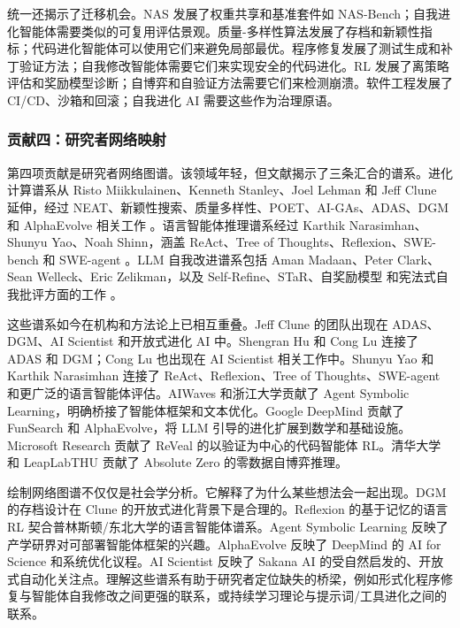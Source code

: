 统一还揭示了迁移机会。NAS 发展了权重共享和基准套件如 NAS-Bench；自我进化智能体需要类似的可复用评估景观。质量-多样性算法发展了存档和新颖性指标；代码进化智能体可以使用它们来避免局部最优。程序修复发展了测试生成和补丁验证方法；自我修改智能体需要它们来实现安全的代码进化。RL 发展了离策略评估和奖励模型诊断；自博弈和自验证方法需要它们来检测崩溃。软件工程发展了 CI/CD、沙箱和回滚；自我进化 AI 需要这些作为治理原语。

\subsubsection{贡献四：研究者网络映射}

第四项贡献是研究者网络图谱。该领域年轻，但文献揭示了三条汇合的谱系。进化计算谱系从 Risto Miikkulainen、Kenneth Stanley、Joel Lehman 和 Jeff Clune 延伸，经过 NEAT、新颖性搜索、质量多样性、POET、AI-GAs、ADAS、DGM 和 AlphaEvolve 相关工作 \cite{stanley2002evolving,lehman2011abandoning,clune2019ai,adas2025,darwingodelmachine2025}。语言智能体推理谱系经过 Karthik Narasimhan、Shunyu Yao、Noah Shinn，涵盖 ReAct、Tree of Thoughts、Reflexion、SWE-bench 和 SWE-agent \cite{yao2023react,yao2023tree,reflexion2023}。LLM 自我改进谱系包括 Aman Madaan、Peter Clark、Sean Welleck、Eric Zelikman，以及 Self-Refine、STaR、自奖励模型 \cite{selfrewarding2024} 和宪法式自我批评方面的工作 \cite{selfrefine2023,star2022,constitutionalai2022}。

这些谱系如今在机构和方法论上已相互重叠。Jeff Clune 的团队出现在 ADAS、DGM、AI Scientist 和开放式进化 AI 中。Shengran Hu 和 Cong Lu 连接了 ADAS 和 DGM；Cong Lu 也出现在 AI Scientist 相关工作中。Shunyu Yao 和 Karthik Narasimhan 连接了 ReAct、Reflexion、Tree of Thoughts、SWE-agent 和更广泛的语言智能体评估。AIWaves 和浙江大学贡献了 Agent Symbolic Learning，明确桥接了智能体框架和文本优化。Google DeepMind 贡献了 FunSearch 和 AlphaEvolve，将 LLM 引导的进化扩展到数学和基础设施。Microsoft Research 贡献了 ReVeal 的以验证为中心的代码智能体 RL。清华大学和 LeapLabTHU 贡献了 Absolute Zero 的零数据自博弈推理。

绘制网络图谱不仅仅是社会学分析。它解释了为什么某些想法会一起出现。DGM 的存档设计在 Clune 的开放式进化背景下是合理的。Reflexion 的基于记忆的语言 RL 契合普林斯顿/东北大学的语言智能体谱系。Agent Symbolic Learning 反映了产学研界对可部署智能体框架的兴趣。AlphaEvolve 反映了 DeepMind 的 AI for Science 和系统优化议程。AI Scientist 反映了 Sakana AI 的受自然启发的、开放式自动化关注点。理解这些谱系有助于研究者定位缺失的桥梁，例如形式化程序修复与智能体自我修改之间更强的联系，或持续学习理论与提示词/工具进化之间的联系。


